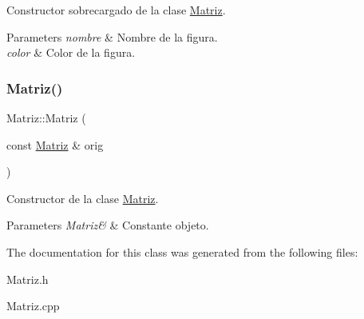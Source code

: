 Constructor sobrecargado de la clase \hyperlink{class_matriz}{Matriz}. 


\begin{DoxyParams}{Parameters}
{\em nombre} & Nombre de la figura. \\
\hline
{\em color} & Color de la figura. \\
\hline
\end{DoxyParams}
\hypertarget{class_matriz_a2e92dacecb0b51f061fccc56bd89ee4a}{}\label{class_matriz_a2e92dacecb0b51f061fccc56bd89ee4a} 
\subsubsection{\texorpdfstring{Matriz()}{Matriz()}\hspace{0.1cm}{\footnotesize\ttfamily [2/2]}}
{\ttfamily Matriz\+::\+Matriz (\begin{DoxyParamCaption}\item[{const \hyperlink{class_matriz}{Matriz} \&}]{orig }\end{DoxyParamCaption})}



Constructor de la clase \hyperlink{class_matriz}{Matriz}. 


\begin{DoxyParams}{Parameters}
{\em Matriz\&} & Constante objeto. \\
\hline
\end{DoxyParams}


The documentation for this class was generated from the following files\+:\begin{DoxyCompactItemize}
\item 
Matriz.\+h\item 
Matriz.\+cpp\end{DoxyCompactItemize}
